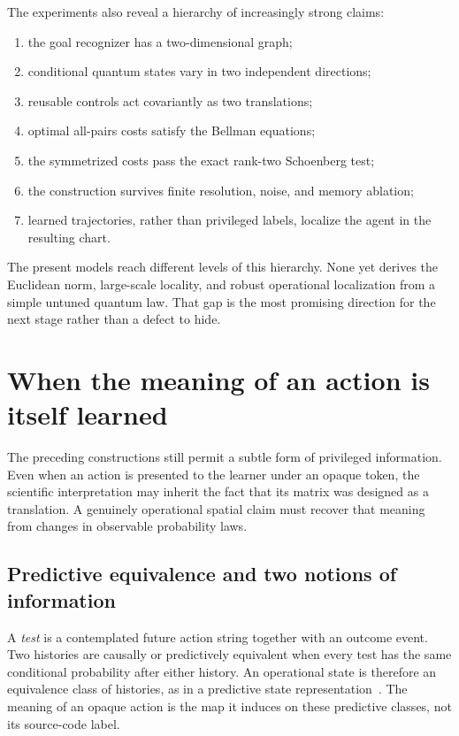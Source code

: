\documentclass[11pt]{article}
\begin{document}
The experiments also reveal a hierarchy of increasingly strong claims:
\begin{enumerate}
 \item the goal recognizer has a two-dimensional graph;
 \item conditional quantum states vary in two independent directions;
 \item reusable controls act covariantly as two translations;
 \item optimal all-pairs costs satisfy the Bellman equations;
 \item the symmetrized costs pass the exact rank-two Schoenberg test;
 \item the construction survives finite resolution, noise, and memory
 ablation;
 \item learned trajectories, rather than privileged labels, localize the
 agent in the resulting chart.
\end{enumerate}
The present models reach different levels of this hierarchy. None yet derives
the Euclidean norm, large-scale locality, and robust operational localization
from a simple untuned quantum law. That gap is the most promising direction
for the next stage rather than a defect to hide.

\section{When the meaning of an action is itself learned}
\label{sec:informative-actions}

The preceding constructions still permit a subtle form of privileged
information. Even when an action is presented to the learner under an opaque
token, the scientific interpretation may inherit the fact that its matrix was
designed as a translation. A genuinely operational spatial claim must recover
that meaning from changes in observable probability laws.

\subsection{Predictive equivalence and two notions of information}

A \emph{test} is a contemplated future action string together with an outcome
event. Two histories are causally or predictively equivalent when every test
has the same conditional probability after either history. An operational
state is therefore an equivalence class of histories, as in a predictive state
representation~\cite{littman2001}. The meaning of an opaque action is the map
it induces on these predictive classes, not its source-code label.
\end{document}
